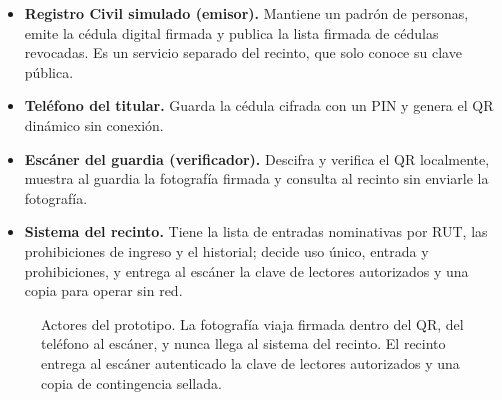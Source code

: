 \begin{itemize}
  \item \textbf{Registro Civil simulado (emisor).} Mantiene un padrón de personas, emite la cédula
        digital firmada y publica la lista firmada de cédulas revocadas. Es un servicio separado del
        recinto, que solo conoce su clave pública.
  \item \textbf{Teléfono del titular.} Guarda la cédula cifrada con un PIN y genera el QR dinámico
        sin conexión.
  \item \textbf{Escáner del guardia (verificador).} Descifra y verifica el QR localmente, muestra al
        guardia la fotografía firmada y consulta al recinto sin enviarle la fotografía.
  \item \textbf{Sistema del recinto.} Tiene la lista de entradas nominativas por RUT, las
        prohibiciones de ingreso y el historial; decide uso único, entrada y prohibiciones, y
        entrega al escáner la clave de lectores autorizados y una copia para operar sin red.
\end{itemize}

\begin{figure}[htbp]
  \centering
  \caption{Actores del prototipo. La fotografía viaja firmada dentro del QR, del teléfono al escáner,
    y nunca llega al sistema del recinto. El recinto entrega al escáner autenticado la clave de
    lectores autorizados y una copia de contingencia sellada.}
  \label{fig:prototipo-arquitectura}
\end{figure}

